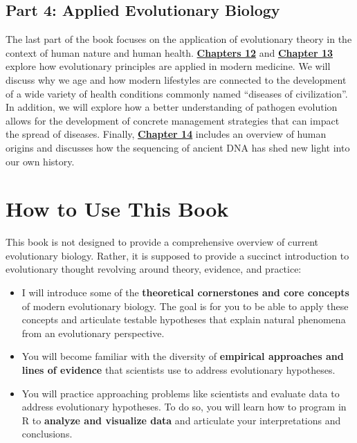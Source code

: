 \documentclass[
]{book}
\providecommand{\tightlist}{%
  \setlength{\itemsep}{0pt}\setlength{\parskip}{0pt}}
\begin{document}
\hypertarget{part-4-applied-evolutionary-biology}{%
\subsection*{Part 4: Applied Evolutionary Biology}\label{part-4-applied-evolutionary-biology}}

The last part of the book focuses on the application of evolutionary theory in the context of human nature and human health. \href{evolutionary-medicine-i-aging-and-diseases-of-civilization.html}{\textbf{Chapters 12}} and \href{evolutionary-medicine-ii-evolving-pathogens.html}{\textbf{Chapter 13}} explore how evolutionary principles are applied in modern medicine. We will discuss why we age and how modern lifestyles are connected to the development of a wide variety of health conditions commonly named ``diseases of civilization''. In addition, we will explore how a better understanding of pathogen evolution allows for the development of concrete management strategies that can impact the spread of diseases. Finally, \href{human-origins-and-human-mediated-evolution.html}{\textbf{Chapter 14}} includes an overview of human origins and discusses how the sequencing of ancient DNA has shed new light into our own history.

\hypertarget{how-to-use-this-book}{%
\section*{How to Use This Book}\label{how-to-use-this-book}}

This book is not designed to provide a comprehensive overview of current evolutionary biology. Rather, it is supposed to provide a succinct introduction to evolutionary thought revolving around theory, evidence, and practice:

\begin{itemize}
\tightlist
\item
  I will introduce some of the \textbf{theoretical cornerstones and core concepts} of modern evolutionary biology. The goal is for you to be able to apply these concepts and articulate testable hypotheses that explain natural phenomena from an evolutionary perspective.
\item
  You will become familiar with the diversity of \textbf{empirical approaches and lines of evidence} that scientists use to address evolutionary hypotheses.
\item
  You will practice approaching problems like scientists and evaluate data to address evolutionary hypotheses. To do so, you will learn how to program in R to \textbf{analyze and visualize data} and articulate your interpretations and conclusions.
\end{itemize}
\end{document}
